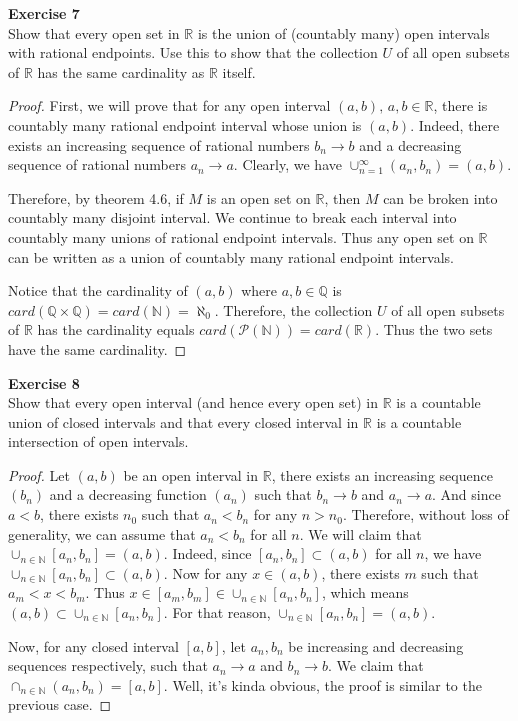 \documentclass[12pt, a4paper]{article}
\theoremstyle{plain}
\newcommand{\N}{\mathbb{N}}
\newcommand{\Q}{\mathbb{Q}}
\newcommand{\R}{\mathbb{R}}
\newenvironment{exercise}[2][Exercise]
    { \begin{mdframed}[backgroundcolor=gray!20] \textbf{#1 #2} \\}
    {  \end{mdframed}}
\begin{document}
\begin{exercise}{7}
Show that every open set in $\R$ is the union of (countably many) open intervals with rational endpoints. Use this to show that the collection $U$ of all open subsets of $\R$ has the same cardinality as $\R$ itself.
\end{exercise}
	\begin{proof}
	First, we will prove that for any open interval $(a,b),\, a,b\in\R$, there is countably many rational endpoint interval whose union is $(a,b)$. Indeed, there exists an increasing sequence of rational numbers $b_n\rightarrow b$ and a decreasing sequence of rational numbers $a_n\rightarrow a$. Clearly, we have $\cup_{n=1}^\infty (a_n,b_n)=(a,b)$. 
	
	Therefore, by theorem 4.6, if $M$ is an open set on $\R$, then $M$ can be broken into countably many disjoint interval. We continue to break each interval into countably many unions of rational endpoint intervals. Thus any open set on $\R$ can be written as a union of countably many rational endpoint intervals.
	
	Notice that the cardinality of $(a,b)$ where $a,b\in \Q$ is $card(\Q\times\Q )=card(\N)=\aleph_0$. Therefore, the collection $U$ of all open subsets of $\R$ has the cardinality equals $card(\mathcal{P}(\N))=card(\R)$. Thus the two sets have the same cardinality.
	\end{proof}

\begin{exercise}{8}
Show that every open interval (and hence every open set) in $\R$ is a countable union of closed intervals and that every closed interval in $\R$ is a countable intersection of open intervals.
\end{exercise}
	\begin{proof}
	Let $(a,b)$ be an open interval in $\R$, there exists an increasing sequence $(b_n)$ and a decreasing function $(a_n)$ such that $b_n\rightarrow b$ and $a_n\rightarrow a$. And since $a<b$, there exists $n_0$ such that $a_n<b_n$ for any $n>n_0$. Therefore, without loss of generality, we can assume that $a_n<b_n$ for all $n$. We will claim that $\cup_{n\in\N}[a_n,b_n]=(a,b)$. Indeed, since $[a_n,b_n]\subset (a,b)$ for all $n$, we have $\cup_{n\in\N}[a_n,b_n]\subset (a,b)$. Now for any $x\in (a,b)$, there exists $m$ such that $a_m<x<b_m$. Thus  $x\in [a_m,b_m]\in \cup_{n\in\N} [a_n,b_n]$, which means $(a,b)\subset \cup_{n\in\N}[a_n,b_n]$. For that reason, $\cup_{n\in\N}[a_n,b_n]=(a,b)$.
	
	Now, for any closed interval $[a,b]$, let $a_n,b_n$ be increasing and decreasing sequences respectively, such that $a_n\rightarrow a$ and $b_n\rightarrow b$. We claim that $\cap_{n\in \N}(a_n,b_n)=[a,b]$. Well, it's kinda obvious, the proof is similar to the previous case.
	\end{proof}
\end{document}
